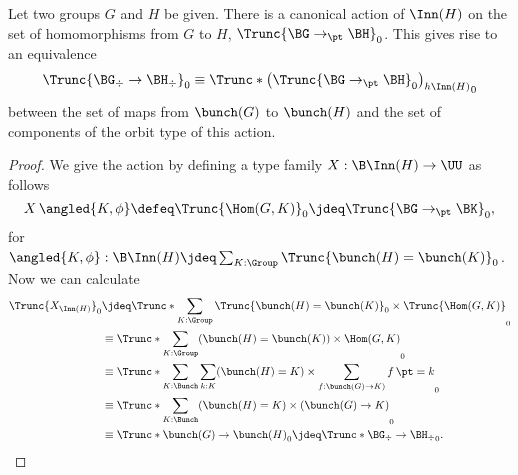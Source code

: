 \begin{theorem}
  Let two groups $G$ and $H$ be given.
  There is a canonical action of $\Inn(H)$
  on the set of homomorphisms from $G$ to $H$, $\Trunc{\BG \to_\pt \BH}_0$.
  This gives rise to an equivalence
  \[
    \Trunc{\BG_\div \to \BH_\div}_0 \equiv \Trunc*{\left(\Trunc{\BG \to_\pt \BH}_0\right) _{h\Inn(H)}}_0
  \]
  between the set of maps from $\bunch(G)$ to $\bunch(H)$ and the set of
  components of the orbit type of this action.
\end{theorem}
\begin{proof}
  We give the action by defining a type family $X : \B\Inn(H) \to \UU$ as follows
  \[
    X\, \angled{K,\phi} \defeq \Trunc{\Hom(G,K)}_0 \jdeq \Trunc{\BG \to_\pt \BK}_0,
  \]
  for $\angled{K,\phi} : \B\Inn(H) \jdeq \sum_{K : \Group} \Trunc{\bunch(H) = \bunch(K)}_0$.
  Now we can calculate
  \begin{align*}
    \Trunc{X_{\Inn(H)}}_0
    &\jdeq \Trunc*{\sum_{K:\Group}\Trunc{\bunch(H)=\bunch(K)}_0\times\Trunc{\Hom(G,K)}}_0 \\
    &\equiv \Trunc*{\sum_{K:\Group}(\bunch(H)=\bunch(K))\times\Hom(G,K)}_0 \\
    &\equiv \Trunc*{\sum_{K:\Bunch}\sum_{k:K}(\bunch(H)=K)\times\sum_{f:\bunch(G)\to K)}\mathop f \pt = k}_0 \\
    &\equiv \Trunc*{\sum_{K:\Bunch} (\bunch(H)=K) \times(\bunch(G) \to K)}_0 \\
    &\equiv \Trunc*{\bunch(G)\to\bunch(H)}_0 \jdeq \Trunc*{\BG_\div \to \BH_\div}_0.\qedhere
  \end{align*}
\end{proof}





